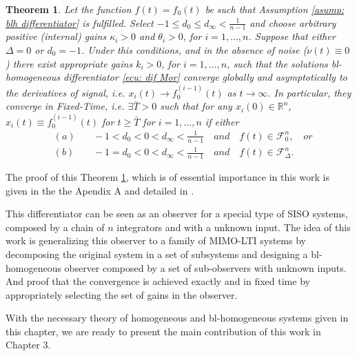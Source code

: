 \documentclass[11pt,letterpaper,twoside,openright]{report}
\newtheorem{theorem}{Theorem}[chapter]
\begin{document}
\begin{theorem}\label{theo: est diff blh}
	\cite{Moreno2021} Let the function $f(t)=f_0(t)$ be such that Assumption \ref{asump: blh differentiator} is fulfilled. Select $-1 \leq d_0 \leq d_\infty < \frac{1}{n-1}$ and choose arbitrary positive (internal) gains $\kappa_i>0$ and $\theta_i>0$, for $i=1,...,n$. Suppose that either $\Delta=0$ or $d_0=-1$. Under this conditions, and in the absence of noise ($\nu(t) \equiv 0$) there exist appropriate gains $k_i>0$, for $i=1,...,n$, such that the solutions bl-homogeneous differentiator \eqref{ecu: dif Mor} converge globally and asymptotically to the derivatives of signal, i.e. $x_i(t) \rightarrow f_0^{(i-1)}(t)$ as $t \rightarrow \infty$. In particular, they converge in Fixed-Time, i.e. $\exists \bar{T}>0$ such that for any $x_i(0) \in \mathbb{R}^n$, $x_i(t) \equiv f_0^{(i-1)}(t)$ for $t \geq \bar{T}$ for $i=1,...,n$ if either
	\begin{eqnarray*}
		&(a)& \quad -1 < d_0 < 0 < d_\infty < \frac{1}{n-1} \quad and \quad f(t)\in \mathscr{F}^{n}_{0},  \quad or \\
		&(b)& \quad -1 = d_0 < 0 < d_\infty < \frac{1}{n-1} \quad and \quad f(t)\in \mathscr{F}^{n}_{\Delta}.
	\end{eqnarray*}
\end{theorem}

The proof of this Theorem \ref{theo: est diff blh}, which is of essential importance in this work is given in the the Apendix A and detailed in \cite{Moreno2021}.

This differentiator can be seen as an observer for a special type of SISO systems, composed by a chain of $n$ integrators and with a unknown input. The idea of this work is generalizing this observer to a family of MIMO-LTI systems by decomposing the original system in a set of subsystems and designing a bl-homogeneous observer composed by a set of sub-observers with unknown inputs. And proof that the convergence is achieved exactly and in fixed time by appropriately selecting the set of gains in the observer. 

With the necessary theory of homogeneous and bl-homogeneous systems given in this chapter, we are ready to present the main contribution of this work in Chapter 3.








	 
	
\end{document}
